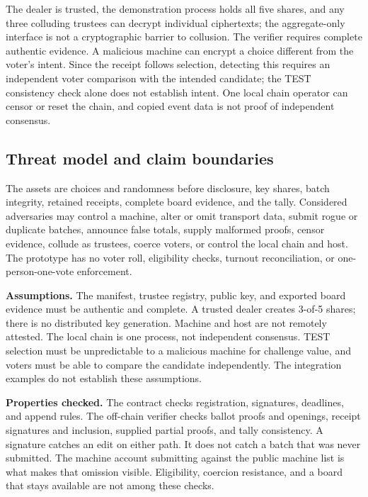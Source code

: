 \documentclass[11pt]{article}
\begin{document}
The dealer is trusted, the demonstration process holds all five shares, and any three colluding trustees can decrypt individual ciphertexts; the aggregate-only interface is not a cryptographic barrier to collusion. The verifier requires complete authentic evidence. A malicious machine can encrypt a choice different from the voter's intent. Since the receipt follows selection, detecting this requires an independent voter comparison with the intended candidate; the TEST consistency check alone does not establish intent. One local chain operator can censor or reset the chain, and copied event data is not proof of independent consensus.

\subsection{Threat model and claim boundaries}
The assets are choices and randomness before disclosure, key shares, batch integrity, retained receipts, complete board evidence, and the tally. Considered adversaries may control a machine, alter or omit transport data, submit rogue or duplicate batches, announce false totals, supply malformed proofs, censor evidence, collude as trustees, coerce voters, or control the local chain and host. The prototype has no voter roll, eligibility checks, turnout reconciliation, or one-person-one-vote enforcement.

\textbf{Assumptions.} The manifest, trustee registry, public key, and exported board evidence must be authentic and complete. A trusted dealer creates 3-of-5 shares; there is no distributed key generation. Machine and host are not remotely attested. The local chain is one process, not independent consensus. TEST selection must be unpredictable to a malicious machine for challenge value, and voters must be able to compare the candidate independently. The integration examples do not establish these assumptions.

\textbf{Properties checked.} The contract checks registration, signatures, deadlines, and append rules. The off-chain verifier checks ballot proofs and openings, receipt signatures and inclusion, supplied partial proofs, and tally consistency. A signature catches an edit on either path. It does not catch a batch that was never submitted. The machine account submitting against the public machine list is what makes that omission visible. Eligibility, coercion resistance, and a board that stays available are not among these checks.
\end{document}
